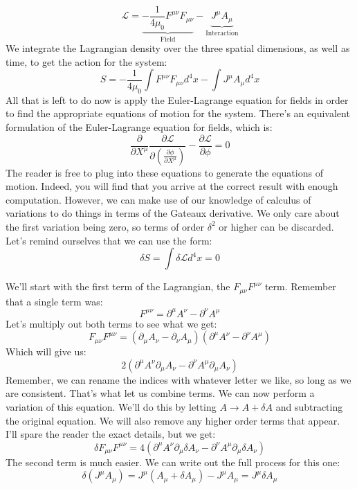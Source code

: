 $$\mathcal{L}=\underbrace{-\frac{1}{4\mu_0}F^{\mu\nu}F_{\mu\nu}}_{\text{Field}}-\underbrace{J^\mu A_\mu}_\text{Interaction}$$
We integrate the \gls{Lagrangian} density over the three spatial dimensions, as well as time, to get the action for the system:
$$S=-\frac{1}{4\mu_0}\int F^{\mu\nu}F_{\mu\nu}d^4x-\int J^\mu A_\mu d^4x$$
All that is left to do now is apply the Euler-Lagrange equation for fields in order to find the appropriate equations of motion for the system. There's an equivalent formulation of the Euler-Lagrange equation for fields, which is:
$$\frac{\partial}{\partial X^\mu}\frac{\partial \mathcal{L}}{\partial \left(\frac{\partial \phi}{\partial X^\mu}\right)}-\frac{\partial \mathcal{L}}{\partial \phi}=0$$
The reader is free to plug into these equations to generate the equations of motion. Indeed, you will find that you arrive at the correct result with enough computation. However, we can make use of our knowledge of calculus of variations to do things in terms of the Gateaux derivative. We only care about the first variation being zero, so terms of order $\delta^2$ or higher can be discarded. Let's remind ourselves that we can use the form:
$$\delta S=\int\delta\mathcal{L} d^4x=0$$

We'll start with the first term of the \gls{Lagrangian}, the $F_{\mu\nu}F^{\mu\nu}$ term. Remember that a single term was:
$$F^{\mu\nu}=\partial^\mu A^\nu-\partial^\nu A^\mu$$
Let's multiply out both terms to see what we get:
$$F_{\mu\nu}F^{\mu\nu}=(\partial_\mu A_\nu-\partial_\nu A_\mu)(\partial^\mu A^\nu-\partial^\nu A^\mu)$$
Which will give us:
$$2(\partial^\mu A^\nu\partial_\mu A_\nu-\partial^\nu A^\mu\partial_\mu A_\nu)$$
Remember, we can rename the indices with whatever letter we like, so long as we are consistent. That's what let us combine terms. We can now perform a variation of this equation. We'll do this by letting $A\rightarrow A+\delta A$ and subtracting the original equation. We will also remove any higher order terms that appear. I'll spare the reader the exact details, but we get:
$$\delta F_{\mu\nu}F^{\mu\nu}=4(\partial^\mu A^\nu\partial_\mu \delta A_\nu-\partial^\nu A^\mu\partial_\mu \delta A_\nu)$$
The second term is much easier. We can write out the full process for this one:
$$\delta(J^\mu A_\mu)=J^\mu(A_\mu+\delta A_\mu) - J^\mu A_\mu=J^\mu\delta A_\mu$$

